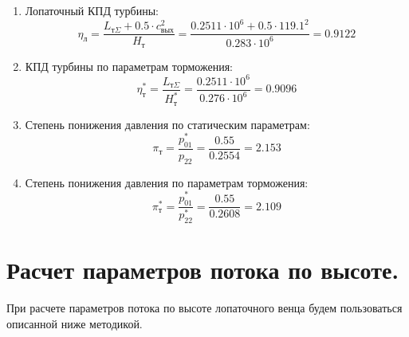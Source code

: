 \documentclass[a4paper,10pt]{article}
\begin{document}
\begin{enumerate}
        \item Лопаточный КПД турбины:
        \[
            \eta_л = \frac{
                        L_{т\Sigma} + 0.5 \cdot c_{вых}^2
                    }{ H_т } =
            \frac{
                0.2511 \cdot 10^6 + 0.5 \cdot 119.1 ^ 2
            }{ 0.283 \cdot 10^6 } =
            0.9122
        \]

        \item КПД турбины по параметрам торможения:
        \[
            \eta_т^* = \frac{ L_{т\Sigma} }{ H_т^* } =
                \frac{ 0.2511 \cdot 10^6 }{ 0.276 \cdot 10^6 } =
            0.9096
        \]

        \item Степень понижения давления по статическим параметрам:
        \[
            \pi_{т} = \frac{p_{01}^*}{p_{2 2}} =
            \frac{0.55}{0.2554} =
            2.153
        \]

        \item Степень понижения давления по параметрам торможения:
        \[
            \pi_{т}^* = \frac{p_{01}^*}{p_{2 2}^*} =
            \frac{0.55}{0.2608} =
            2.109
        \]

    \end{enumerate}
    

    \section{Расчет параметров потока по высоте.}

    

    При расчете параметров потока по высоте лопаточного венца будем пользоваться описанной ниже методикой.
\end{document}
